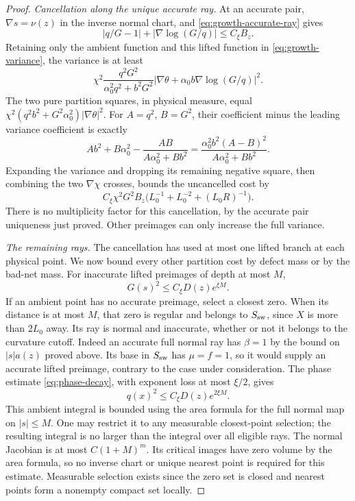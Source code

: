 \begin{proof}
\emph{Cancellation along the unique accurate ray.}
At an accurate pair, $\nabla s=\nu(z)$ in the inverse normal chart, and
\eqref{eq:growth-accurate-ray} gives
\[
 |q/G-1|+|\nabla\log(G/q)|\le C_\xi B_z.
\]
Retaining only the ambient function and this lifted function in
\eqref{eq:growth-variance}, the variance is at least
\[
 \chi^2\frac{q^2G^2}{\alpha_0^2q^2+b^2G^2}
 \left|\nabla\theta+\alpha_0b\nabla\log(G/q)\right|^2.
\]
The two pure partition squares, in physical measure, equal
$\chi^2(q^2b^2+G^2\alpha_0^2)|\nabla\theta|^2$.
For $A=q^2$, $B=G^2$, their coefficient minus the leading variance
coefficient is exactly
\[
 Ab^2+B\alpha_0^2-\frac{AB}{A\alpha_0^2+Bb^2}
 =\frac{\alpha_0^2b^2(A-B)^2}{A\alpha_0^2+Bb^2}.
\]
Expanding the variance and dropping its remaining negative square,
then combining the two $\nabla\chi$ crosses, bounds the uncancelled
cost by
\begin{equation}\label{eq:growth-accurate-error}
 C_\xi\chi^2G^2B_z
       \bigl(L_0^{-1}+L_0^{-2}+(L_0R)^{-1}\bigr).
\end{equation}
There is no multiplicity factor for this cancellation, by the accurate
pair uniqueness just proved.  Other preimages can only increase the
full variance.

\emph{The remaining rays.}
The cancellation has used at most one lifted branch at each physical
point.  We now bound every other partition cost by defect mass or by
the bad-net mass.  For inaccurate lifted preimages of depth at most $M$,
\[
 G(s)^2\le C_\xi D(z)e^{\xi M}.
\]
If an ambient point has no accurate preimage, select a closest zero.
When its distance is at most $M$, that zero is regular and belongs to
$S_{\rm sw}$, since $X$ is more than $2L_0$ away.  Its ray is normal
and inaccurate, whether or not it belongs to the curvature cutoff.
Indeed an accurate full normal ray has $\beta=1$ by the bound on
$|s|a(z)$ proved above.  Its base in $S_{\rm sw}$ has $\mu=f=1$, so
it would supply an accurate lifted preimage, contrary to the case
under consideration.
The phase estimate \eqref{eq:phase-decay}, with exponent loss at most
$\xi/2$, gives
\[
 q(x)^2\le C_\xi D(z)e^{2\xi M}.
\]
This ambient integral is bounded using the area formula for the full
normal map on $|s|\le M$.  One may restrict it to any measurable
closest-point selection; the resulting integral is no larger than the
integral over all eligible rays.  The normal Jacobian is at most
$C(1+M)^m$.  Its critical images have zero volume by the area formula,
so no inverse chart or unique nearest point is required for this
estimate.  Measurable selection exists since the zero set is closed
and nearest points form a nonempty compact set locally.


\end{proof}
